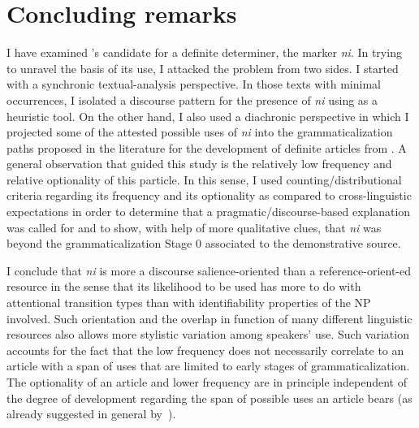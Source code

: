 \documentclass[output=paper
,modfonts
,nonflat]{langsci/langscibook}
\begin{document}
\section{Concluding remarks}\label{sec:pico:5}

I have examined 's candidate for a definite determiner, the marker \textit{ni}.  
In trying to unravel the basis of its use, I attacked the problem from two sides. I started with a synchronic textual-analysis perspective. In those texts with minimal occurrences, I isolated a discourse pattern for the presence of \textit{ni} using  as a heuristic tool. On the other hand, I also used a diachronic perspective in which I projected some of the attested possible uses of \textit{ni} into the grammaticalization paths proposed in the literature for the development of definite articles from . 
A general observation that guided this study is the relatively low frequency and relative optionality of this particle. In this sense, I used counting/distributional criteria regarding its frequency and its optionality as compared to cross-linguistic expectations in order to determine that a pragmatic/discourse-based explanation was called for and to show, with help of more qualitative clues, that \textit{ni} was beyond the grammaticalization Stage 0 associated to the demonstrative source.

I conclude that \textit{ni} is more a discourse salience-oriented than a reference-orient\hyp{}ed resource in the sense that its likelihood to be used has more to do with attentional transition types than with identifiability properties of the NP involved. Such orientation and the overlap in function of many different linguistic resources also allows more stylistic variation among speakers' use. Such variation accounts for the fact that the low frequency does not necessarily correlate to an article with a span of uses that are limited to early stages of grammaticalization.
The optionality of an article and lower frequency are in principle independent of  the degree of development regarding the span of possible uses an article bears (as already suggested in general by~\citealt{Dryer2014}).
\end{document}
